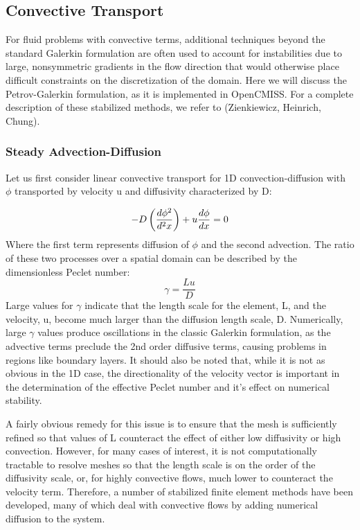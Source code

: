 \subsection{Convective Transport}

For fluid problems with convective terms, additional techniques beyond the standard Galerkin formulation are often used to account for instabilities due to large, nonsymmetric gradients in the flow direction that would otherwise place difficult constraints on the discretization of the domain. Here we will discuss the Petrov-Galerkin formulation, as it is implemented in OpenCMISS. For a complete description of these stabilized methods, we refer to (Zienkiewicz, Heinrich, Chung). 

\subsubsection{Steady Advection-Diffusion}

Let us first consider linear convective transport for 1D convection-diffusion with $\phi$ transported by velocity u and diffusivity characterized by D:

\begin{equation}
  -D\left( \frac{d\phi^2}{d^2x} \right)+u\frac{d\phi}{dx}=0
  \label{eqn:AdvectionDiffusion}
\end{equation}
Where the first term represents diffusion of $\phi$ and the second advection. The ratio of these two processes over a spatial domain can be described by the dimensionless Peclet number:
\begin{equation}
 \gamma=\frac{Lu}{D}
\end{equation}
Large values for $\gamma$ indicate that the length scale for the element, L, and the velocity, u, become much larger than the diffusion length scale, D. Numerically, large $\gamma$ values produce oscillations in the classic Galerkin formulation, as the advective terms preclude the 2nd order diffusive terms, causing problems in regions like boundary layers. It should also be noted that, while it is not as obvious in the 1D case, the directionality of the velocity vector is important in the determination of the effective Peclet number and it's effect on numerical stability.

A fairly obvious remedy for this issue is to ensure that the mesh is sufficiently refined so that values of L counteract the effect of either low diffusivity or high convection. However, for many cases of interest, it is not computationally tractable to resolve meshes so that the length scale is on the order of the diffusivity scale, or, for highly convective flows, much lower to counteract the velocity term. Therefore, a number of stabilized finite element methods have been developed, many of which deal with convective flows by adding numerical diffusion to the system.

